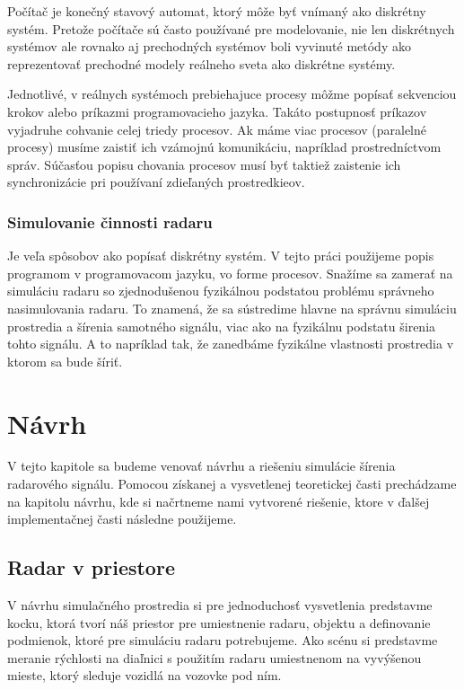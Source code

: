     Počítač je konečný stavový automat, ktorý môže byť vnímaný ako diskrétny systém. Pretože počítače sú často používané pre modelovanie, nie len diskrétnych systémov ale rovnako aj prechodných systémov boli vyvinuté metódy ako reprezentovať prechodné modely reálneho sveta ako diskrétne systémy.

    Jednotlivé, v reálnych systémoch prebiehajuce procesy môžme popísať sekvenciou krokov alebo príkazmi programovacieho jazyka. Takáto postupnosť príkazov vyjadruhe cohvanie celej triedy procesov. Ak máme viac procesov (paralelné procesy) musíme zaistiť ich vzámojnú komunikáciu, napríklad prostredníctvom správ. Súčasťou popisu chovania procesov musí byť taktiež zaistenie ich synchronizácie pri používaní zdieľaných prostredkieov\cite{imsopora}.

  \subsection{Simulovanie činnosti radaru}

    \hspace{0.6cm}Je veľa spôsobov ako popísať diskrétny systém. V tejto práci použijeme popis programom v programovacom jazyku, vo forme procesov.
    Snažíme sa zamerať na simuláciu radaru so zjednodušenou fyzikálnou podstatou problému správneho nasimulovania radaru. To znamená, že sa sústredime hlavne na správnu simuláciu prostredia a šírenia samotného signálu, viac ako na fyzikálnu podstatu širenia tohto signálu. A to napríklad tak, že zanedbáme fyzikálne vlastnosti prostredia v ktorom sa bude šíriť.

\chapter{Návrh}

  \hspace{0.6cm}V tejto kapitole sa budeme venovať návrhu a riešeniu simulácie šírenia radarového signálu. Pomocou získanej a vysvetlenej teoretickej časti prechádzame na kapitolu návrhu, kde si načrtneme nami vytvorené riešenie, ktore v ďalšej implementačnej časti následne použijeme.

  \section{Radar v priestore}
    \hspace{0.6cm}V návrhu simulačného prostredia si pre jednoduchosť vysvetlenia predstavme kocku, ktorá tvorí náš priestor pre umiestnenie radaru, objektu a definovanie podmienok, ktoré pre simuláciu radaru potrebujeme. Ako scénu si predstavme meranie rýchlosti na diaľnici s použitím radaru umiestnenom na vyvýšenou mieste, ktorý sleduje vozidlá na vozovke pod ním.

